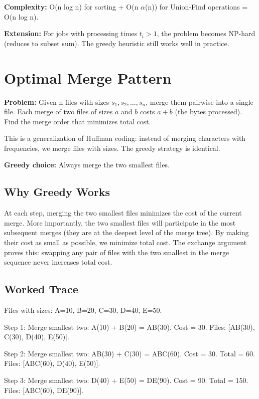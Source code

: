 \textbf{Complexity:} O(n log n) for sorting + O(n $\alpha$(n)) for Union-Find operations = O(n log n).

\textbf{Extension:} For jobs with processing times $t_i > 1$, the problem becomes NP-hard (reduces to subset sum). The greedy heuristic still works well in practice.

\section{Optimal Merge Pattern}

\textbf{Problem:} Given n files with sizes $s_1, s_2, \ldots, s_n$, merge them pairwise into a single file. Each merge of two files of sizes $a$ and $b$ costs $a + b$ (the bytes processed). Find the merge order that minimizes total cost.

This is a generalization of Huffman coding: instead of merging characters with frequencies, we merge files with sizes. The greedy strategy is identical.

\textbf{Greedy choice:} Always merge the two smallest files.

\subsection{Why Greedy Works}

At each step, merging the two smallest files minimizes the cost of the current merge. More importantly, the two smallest files will participate in the most subsequent merges (they are at the deepest level of the merge tree). By making their cost as small as possible, we minimize total cost. The exchange argument proves this: swapping any pair of files with the two smallest in the merge sequence never increases total cost.

\subsection{Worked Trace}

Files with sizes: A=10, B=20, C=30, D=40, E=50.

Step 1: Merge smallest two: A(10) + B(20) = AB(30). Cost = 30. Files: [AB(30), C(30), D(40), E(50)].

Step 2: Merge smallest two: AB(30) + C(30) = ABC(60). Cost = 30. Total = 60. Files: [ABC(60), D(40), E(50)].

Step 3: Merge smallest two: D(40) + E(50) = DE(90). Cost = 90. Total = 150. Files: [ABC(60), DE(90)].

